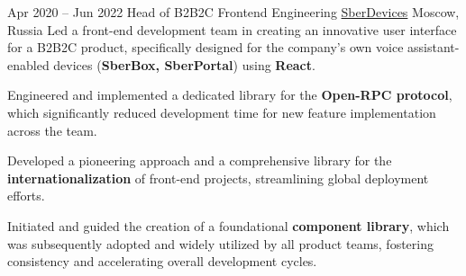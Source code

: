 \cventry
{Apr 2020 – Jun 2022}
{Head of B2B2C Frontend Engineering}
{\href{https://sberdevices.ru}{SberDevices}}
{Moscow, Russia}
{}
{Led a front-end development team in creating an innovative user interface for a B2B2C product, specifically designed for the company's own voice assistant-enabled devices (\textbf{SberBox, SberPortal}) using \textbf{React}.}

\cvlistitem
{Engineered and implemented a dedicated library for the \textbf{Open-RPC protocol}, which significantly reduced development time for new feature implementation across the team.}

\cvlistitem
{Developed a pioneering approach and a comprehensive library for the \textbf{internationalization} of front-end projects, streamlining global deployment efforts.}

\cvlistitem
{Initiated and guided the creation of a foundational \textbf{component library}, which was subsequently adopted and widely utilized by all product teams, fostering consistency and accelerating overall development cycles.}

